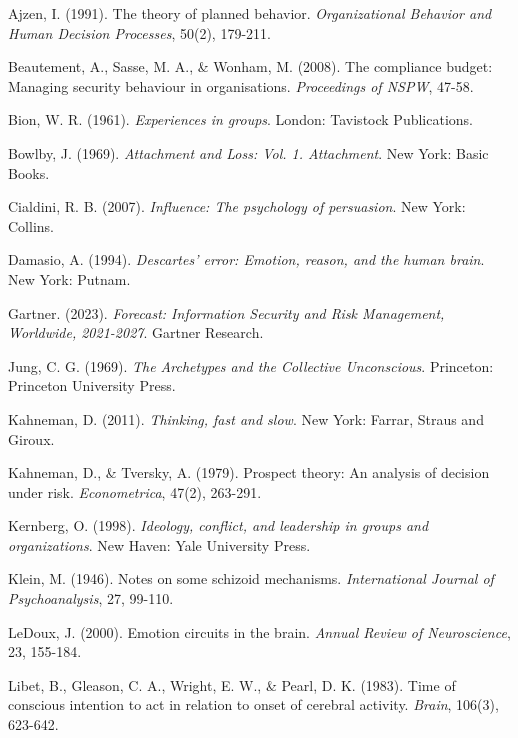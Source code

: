 \documentclass[manuscript,screen,review]{acmart}
\begin{document}
\begin{thebibliography}{99}

Ajzen, I. (1991). The theory of planned behavior. \textit{Organizational Behavior and Human Decision Processes}, 50(2), 179-211.

Beautement, A., Sasse, M. A., \& Wonham, M. (2008). The compliance budget: Managing security behaviour in organisations. \textit{Proceedings of NSPW}, 47-58.

Bion, W. R. (1961). \textit{Experiences in groups}. London: Tavistock Publications.

Bowlby, J. (1969). \textit{Attachment and Loss: Vol. 1. Attachment}. New York: Basic Books.

Cialdini, R. B. (2007). \textit{Influence: The psychology of persuasion}. New York: Collins.

Damasio, A. (1994). \textit{Descartes' error: Emotion, reason, and the human brain}. New York: Putnam.

Gartner. (2023). \textit{Forecast: Information Security and Risk Management, Worldwide, 2021-2027}. Gartner Research.

Jung, C. G. (1969). \textit{The Archetypes and the Collective Unconscious}. Princeton: Princeton University Press.

Kahneman, D. (2011). \textit{Thinking, fast and slow}. New York: Farrar, Straus and Giroux.

Kahneman, D., \& Tversky, A. (1979). Prospect theory: An analysis of decision under risk. \textit{Econometrica}, 47(2), 263-291.

Kernberg, O. (1998). \textit{Ideology, conflict, and leadership in groups and organizations}. New Haven: Yale University Press.

Klein, M. (1946). Notes on some schizoid mechanisms. \textit{International Journal of Psychoanalysis}, 27, 99-110.

LeDoux, J. (2000). Emotion circuits in the brain. \textit{Annual Review of Neuroscience}, 23, 155-184.

Libet, B., Gleason, C. A., Wright, E. W., \& Pearl, D. K. (1983). Time of conscious intention to act in relation to onset of cerebral activity. \textit{Brain}, 106(3), 623-642.


\end{thebibliography}
\end{document}
